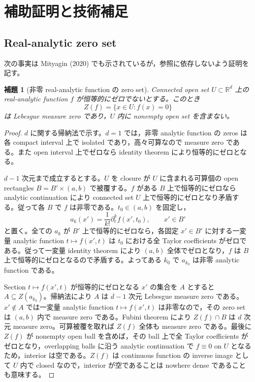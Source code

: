\documentclass[11pt,a4paper]{ltjsarticle}
\newtheorem{lemma}{補題}[section]
\theoremstyle{remark}
\newcommand{\R}{\mathbb R}
\begin{document}
\appendix
\section{補助証明と技術補足}

\subsection{Real-analytic zero set}
次の事実は Mityagin (2020) でも示されているが，参照に依存しないよう証明を記す。
\begin{lemma}[非零 real-analytic function の zero set]\label{lem:analyticzero}
Connected open set $U\subset\R^d$ 上の real-analytic function $f$ が恒等的にゼロでないとする。このとき
\[
Z(f)=\{x\in U:f(x)=0\}
\]
は Lebesgue measure zero であり，$U$ 内に nonempty open set を含まない。
\end{lemma}

\begin{proof}
$d$ に関する帰納法で示す。$d=1$ では，非零 analytic function の zeros は各 compact interval 上で isolated であり，高々可算なので measure zero である。また open interval 上でゼロなら identity theorem により恒等的にゼロとなる。

$d-1$ 次元まで成立するとする。$U$ を closure が $U$ に含まれる可算個の open rectangles $B=B'\times(a,b)$ で被覆する。$f$ がある $B$ 上で恒等的にゼロなら analytic continuation により connected set $U$ 上で恒等的にゼロとなり矛盾する。従って各 $B$ で $f$ は非零である。$t_0\in(a,b)$ を固定し，
\[
a_k(x')=\frac{1}{k!}\partial_t^kf(x',t_0),
\qquad x'\in B'
\]
と置く。全ての $a_k$ が $B'$ 上で恒等的にゼロなら，各固定 $x'\in B'$ に対する一変量 analytic function $t\mapsto f(x',t)$ は $t_0$ における全 Taylor coefficients がゼロである。従って一変量 identity theorem により $(a,b)$ 全体でゼロとなり，$f$ は $B$ 上で恒等的にゼロとなるので矛盾する。よってある $k_0$ で $a_{k_0}$ は非零 analytic function である。

Section $t\mapsto f(x',t)$ が恒等的にゼロとなる $x'$ の集合を $A$ とすると $A\subseteq Z(a_{k_0})$。帰納法により $A$ は $d-1$ 次元 Lebesgue measure zero である。$x'\notin A$ では一変量 analytic function $t\mapsto f(x',t)$ は非零なので，その zero set は $(a,b)$ 内で measure zero である。Fubini theorem により $Z(f)\cap B$ は $d$ 次元 measure zero。可算被覆を取れば $Z(f)$ 全体も measure zero である。最後に $Z(f)$ が nonempty open ball を含めば，その ball 上で全 Taylor coefficients がゼロとなり，overlapping balls に沿う analytic continuation で $f\equiv0$ on $U$ となるため，interior は空である。$Z(f)$ は continuous function の inverse image として $U$ 内で closed なので，interior が空であることは nowhere dense であることも意味する。
\end{proof}
\end{document}
